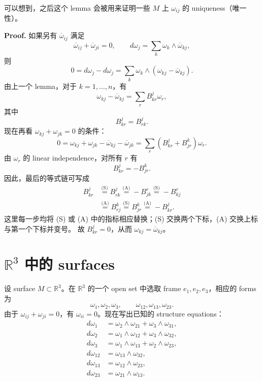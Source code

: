 \documentclass[UTF8,11pt,a4paper]{ctexart}
\begin{document}
可以想到，之后这个 lemma 会被用来证明一些 $M$ 上 $\omega_{ij}$ 的 uniqueness（唯一性）。

\textbf{Proof.} 如果另有 $\overline{\omega}_{ij}$ 满足
\[
\overline{\omega}_{ij}+\overline{\omega}_{ji}=0,
\qquad d\omega_j=\sum_k\omega_k\wedge\overline{\omega}_{kj},
\]
则
\[
0=d\omega_j-d\omega_j
=\sum_k\omega_k\wedge(\omega_{kj}-\overline{\omega}_{kj}).
\]
由上一个 lemma，对于 $k=1,\ldots,n$，有
\[
\omega_{kj}-\overline{\omega}_{kj}=\sum_r B^j_{kr}\omega_r,
\]
其中
\begin{equation}
B^j_{kr}=B^j_{rk}.
\tag{S}\label{eq:dg-B-symmetry}
\end{equation}
现在再看 $\omega_{kj}+\omega_{jk}=0$ 的条件：
\[
0=\omega_{kj}+\omega_{jk}
-\overline{\omega}_{kj}-\overline{\omega}_{jk}
=\sum_r(B^j_{kr}+B^k_{jr})\omega_r.
\]
由 $\omega_r$ 的 linear independence，对所有 $r$ 有
\begin{equation}
B^j_{kr}=-B^k_{jr}.
\tag{A}\label{eq:dg-B-antisymmetry}
\end{equation}
因此，最后的等式链可写成
\begin{align*}
B^j_{kr}
&\overset{\text{(S)}}{=}B^j_{rk}
 \overset{\text{(A)}}{=}-B^r_{jk}
 \overset{\text{(S)}}{=}-B^r_{kj}\\
&\overset{\text{(A)}}{=}B^k_{rj}
 \overset{\text{(S)}}{=}B^k_{jr}
 \overset{\text{(A)}}{=}-B^j_{kr}.
\end{align*}
这里每一步均将 (S) 或 (A) 中的指标相应替换；(S) 交换两个下标，(A) 交换上标与第一个下标并变号。
故 $B^j_{kr}=0$，从而 $\omega_{kj}=\overline{\omega}_{kj}$。

\section{$\mathbb{R}^3$ 中的 surfaces}
设 surface $M\subset\mathbb{R}^3$。在 $\mathbb{R}^3$ 的一个 open set 中选取 frame $e_1,e_2,e_3$，相应的 forms 为
\[
\omega_1,\omega_2,\omega_3,\qquad
\omega_{12},\omega_{13},\omega_{23}.
\]
由于 $\omega_{ij}+\omega_{ji}=0$，有 $\omega_{ii}=0$。现在写出已知的 structure equations：
\begin{align*}
d\omega_1&=\omega_2\wedge\omega_{21}+\omega_3\wedge\omega_{31},\\
d\omega_2&=\omega_1\wedge\omega_{12}+\omega_3\wedge\omega_{32},\\
d\omega_3&=\omega_1\wedge\omega_{13}+\omega_2\wedge\omega_{23},\\
d\omega_{12}&=\omega_{13}\wedge\omega_{32},\\
d\omega_{13}&=\omega_{12}\wedge\omega_{23},\\
d\omega_{23}&=\omega_{21}\wedge\omega_{13}.
\end{align*}
\end{document}
